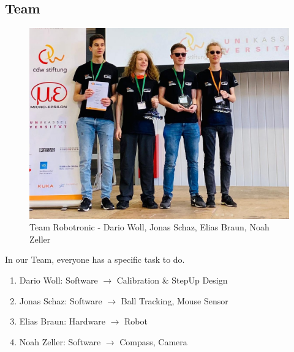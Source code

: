 \documentclass{scrartcl}
\begin{document}
\subsection{Team}
\begin{figure}[h]
    \centering
    \includegraphics[width=\textwidth]{img/Robotronic.jpg}
    \caption{Team Robotronic - Dario Woll, Jonas Schaz, Elias Braun, Noah Zeller}
    \label{fig:team}
\end{figure}
In our Team, everyone has a specific task to do.
\begin{enumerate}
    \item{Dario Woll: Software $\rightarrow$ Calibration \& StepUp Design}
    \item{Jonas Schaz: Software  $\rightarrow$ Ball Tracking, Mouse Sensor}
    \item{Elias Braun: Hardware $\rightarrow$ Robot}
    \item{Noah Zeller: Software $\rightarrow$ Compass, Camera}
\end{enumerate}
\newpage
\end{document}
